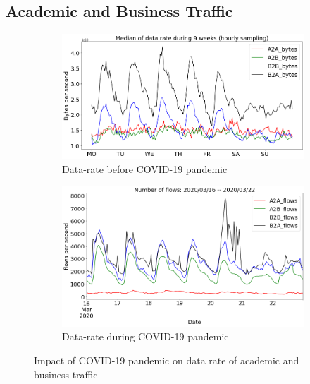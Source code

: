 \documentclass[10pt, journal, letterpaper]{IEEEtran}
\newcommand\figSzeMahdi{0.8}
\begin{document}
\subsection{Academic and Business Traffic}
\begin{figure}
    \begin{subfigure}{\figSzeMahdi\columnwidth}
          \centering
          \includegraphics[width=\columnwidth]{img/BCO_acaBus_bps.png}
          \caption{Data-rate before COVID-19 pandemic}
          \label{fig:BCO_acaBus_bps}
    \end{subfigure}
    \begin{subfigure}{\figSzeMahdi\columnwidth}
          \centering
          \includegraphics[width=\columnwidth]{img/CO2_acaBus_bps.png}
          \caption{Data-rate during COVID-19 pandemic}
          \label{fig:CO_acaBus_bps}
    \end{subfigure}
    \caption{Impact of COVID-19 pandemic on data rate of academic and business traffic}
    \label{fig:datarate_acaBus_BCO_CO}
\end{figure}
\end{document}
